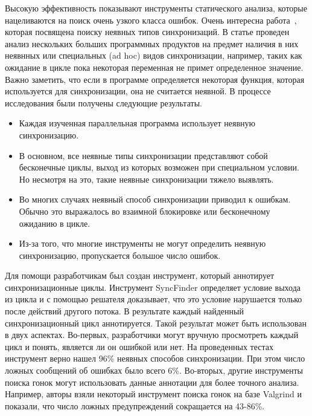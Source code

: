 Высокую эффективность показывают инструменты статического анализа, которые нацеливаются на поиск очень узкого класса ошибок.
Очень интересна работа~\cite{Xiong:2010}, которая посвящена поиску неявных типов синхронизаций.
В статье проведен анализ нескольких больших программных продуктов на предмет наличия в них неявнных или специальных (ad hoc) видов синхронизации, например, таких как ожидание в цикле пока некоторая переменная не примет определенное значение.
Важно заметить, что если в программе определяется некоторая функция, которая используется для синхронизации, она не считается неявной.
В процессе исследования были получены следующие результаты.

\begin{itemize}
\item Каждая изученная параллельная программа использует неявную синхронизацию.
\item В основном, все неявные типы синхронизации представляют собой бесконечные циклы, выход из которых возможен при специальном условии. Но несмотря на это, такие неявные синхронизации тяжело выявлять.
\item Во многих случаях неявный способ синхронизации приводил к ошибкам. Обычно это выражалось во взаимной блокировке или бесконечному ожиданию в цикле. 
\item Из-за того, что многие инструменты не могут определить неявную синхронизацию, пропускается большое число ошибок. 
\end{itemize}

Для помощи разработчикам был создан инструмент, который аннотирует синхронизационные циклы.
Инструмент SyncFinder определяет условие выхода из цикла и с помощью решателя доказывает, что это условие нарушается только после действий другого потока.
В результате каждый найденный синхронизационный цикл аннотируется. Такой результат может быть использован в двух аспектах.
Во-первых, разработчики могут вручную просмотреть каждый цикл и понять, является ли он ошибкой или нет.
На проведенных тестах инструмент верно нашел 96\% неявных способов синхронизации. При этом число ложных сообщений об ошибках было всего 6\%.
Во-вторых, другие инструменты поиска гонок могут использовать данные аннотации для более точного анализа.
Например, авторы взяли некоторый инструмент поиска гонок на базе Valgrind и показали, что число ложных предупреждений сокращается на 43-86\%. 

